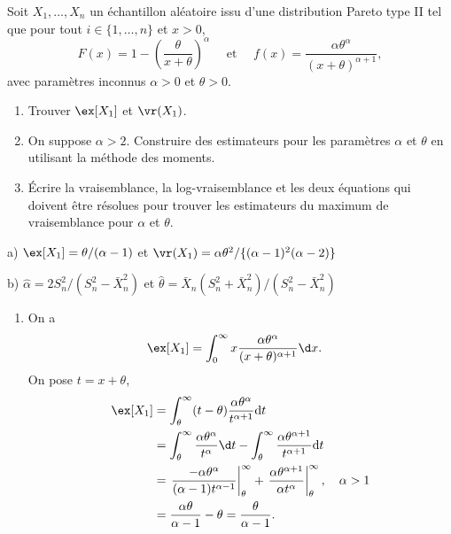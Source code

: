 \begin{exercice}
\label{ex:moment:pareto}
Soit $X_1, \ldots, X_n$ un échantillon aléatoire issu d'une distribution Pareto type II tel que pour tout $i \in \{ 1, \ldots , n\}$ et $x >0$, 
$$
F(x)=1-\left(\frac{\theta}{x+\theta}\right)^\alpha
\quad \mbox{ et } \quad 
f(x)=\frac{\alpha\theta^\alpha}{(x+\theta)^{\alpha+1}},
$$
avec paramètres inconnus $\alpha>0$ et $\theta>0$. 
\begin{enumerate}
\item Trouver $\ex[X_1]$ et $\vr(X_1)$.
\item On suppose $\alpha>2$. Construire des estimateurs pour les paramètres $\alpha$ et $\theta$ en utilisant la méthode des moments.
\item Écrire la vraisemblance, la log-vraisemblance et les deux équations qui doivent être résolues pour trouver les estimateurs du maximum de vraisemblance pour $\alpha$ et $\theta$.
\end{enumerate}
\begin{rep}
a) $\ex[X_1]= \theta/(\alpha-1)$ et $
\vr(X_1)=\alpha\theta^2/\{(\alpha-1)^2(\alpha-2)\}$ 

b) $\hat\alpha = 2S_n^2/(S_n^2-\bar X_n^2)$ et $\hat\theta=\bar X_n (S_n^2+\bar X_n^2)/(S_n^2-\bar X_n^2)$
\end{rep}
\begin{sol}
\begin{enumerate}
\item On a
\begin{align*}
\ex[X_1]&=\int_0^\infty x \frac{\alpha\theta^\alpha}{(x+\theta)^{\alpha+1}}\d x.
\end{align*}
On pose $t=x+\theta$,  
\begin{align*}
\ex[X_1] &= \int_\theta^\infty (t-\theta) \frac{\alpha\theta^\alpha}{t^{\alpha+1}}\mbox{d} t\\
&=\int_\theta^\infty \frac{\alpha\theta^\alpha}{t^{\alpha}}\d t-\int_\theta^\infty \frac{\alpha\theta^{\alpha+1}}{t^{\alpha+1}}\mbox{d} t\\
&= \left.\frac{-\alpha\theta^\alpha}{(\alpha-1)t^{\alpha-1}}\right|_\theta^\infty+ \left.\frac{\alpha\theta^{\alpha+1}}{\alpha t^{\alpha}}\right|_\theta^\infty, \quad \alpha>1\\
&=\frac{\alpha\theta}{\alpha-1}-\theta = \frac{\theta}{\alpha-1}.
\end{align*}


\end{enumerate}
\end{sol}
\end{exercice}

